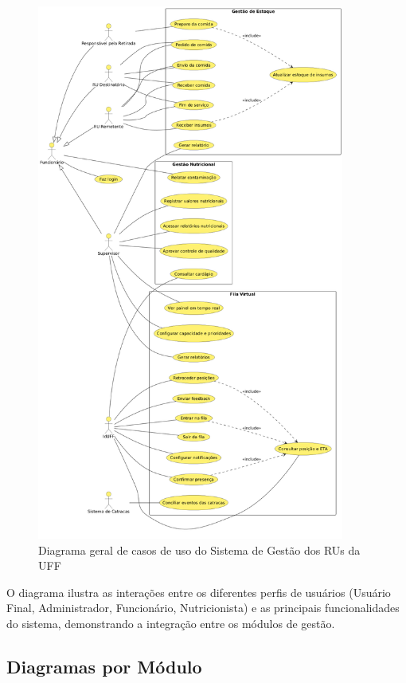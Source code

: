 \documentclass[12pt,a4paper]{article}
\begin{document}
\begin{figure}[H]
    \centering
    \includegraphics[width=0.9\textwidth]{diagramas/diagrama-geral.png}
    \caption{Diagrama geral de casos de uso do Sistema de Gestão dos RUs da UFF}
    \label{fig:diagrama_geral}
\end{figure}

O diagrama ilustra as interações entre os diferentes perfis de usuários (Usuário Final, Administrador, Funcionário, Nutricionista) e as principais funcionalidades do sistema, demonstrando a integração entre os módulos de gestão.

\subsection{Diagramas por Módulo}
\end{document}
